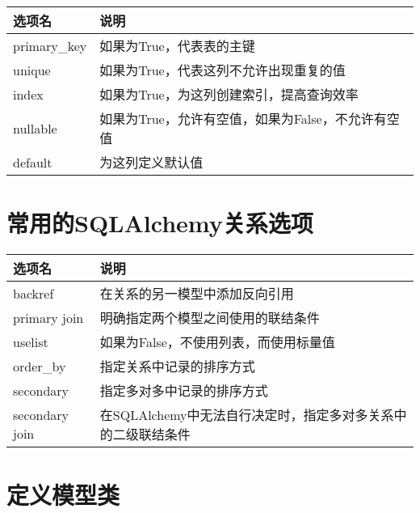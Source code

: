 \documentclass[11pt]{article}
\begin{document}
\begin{longtable}[]{@{}ll@{}}
\toprule
选项名 & 说明\tabularnewline
\midrule
\endhead
primary\_key & 如果为True，代表表的主键\tabularnewline
unique & 如果为True，代表这列不允许出现重复的值\tabularnewline
index & 如果为True，为这列创建索引，提高查询效率\tabularnewline
nullable &
如果为True，允许有空值，如果为False，不允许有空值\tabularnewline
default & 为这列定义默认值\tabularnewline
\bottomrule
\end{longtable}

    \hypertarget{ux5e38ux7528ux7684sqlalchemyux5173ux7cfbux9009ux9879}{%
\section{常用的SQLAlchemy关系选项}\label{ux5e38ux7528ux7684sqlalchemyux5173ux7cfbux9009ux9879}}

\begin{longtable}[]{@{}ll@{}}
\toprule
选项名 & 说明\tabularnewline
\midrule
\endhead
backref & 在关系的另一模型中添加反向引用\tabularnewline
primary join & 明确指定两个模型之间使用的联结条件\tabularnewline
uselist & 如果为False，不使用列表，而使用标量值\tabularnewline
order\_by & 指定关系中记录的排序方式\tabularnewline
secondary & 指定多对多中记录的排序方式\tabularnewline
secondary join &
在SQLAlchemy中无法自行决定时，指定多对多关系中的二级联结条件\tabularnewline
\bottomrule
\end{longtable}

    \hypertarget{ux5b9aux4e49ux6a21ux578bux7c7b}{%
\section{定义模型类}\label{ux5b9aux4e49ux6a21ux578bux7c7b}}
\end{document}
